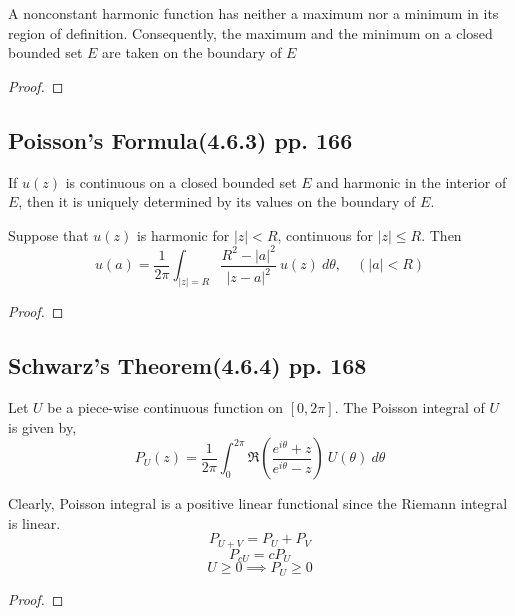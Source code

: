 \begin{theorem}
	A nonconstant harmonic function has neither a maximum nor a minimum in its region of definition. Consequently, the maximum and the minimum on a closed bounded set $E$ are taken on the boundary of $E$
\end{theorem}
\begin{proof}
\end{proof}

\subsection{Poisson's Formula(4.6.3) pp. 166}
\begin{remark}
	If $u(z)$ is continuous on a closed bounded set $E$ and harmonic in the interior of $E$, then it is uniquely determined by its values on the boundary of $E$.
\end{remark}
\begin{theorem}
	Suppose that $u(z)$ is harmonic for $|z| < R$, continuous for $|z| \le R$. Then
	\begin{equation}
		u(a) = \frac{1}{2\pi} \int_{|z|=R} \frac{R^2-|a|^2}{|z-a|^2}\ u(z)\ d\theta, \quad (|a| < R)
	\end{equation}
\end{theorem}
\begin{proof}
\end{proof}

\subsection{Schwarz's Theorem(4.6.4) pp. 168}
\begin{definition}
	Let $U$ be a piece-wise continuous function on $[0,2\pi]$.
	The Poisson integral of $U$ is given by,
	\begin{equation}
		P_U(z) = \frac{1}{2\pi} \int_0^{2\pi} \Re\left(\frac{e^{i\theta}+z}{e^{i\theta}-z}\right)\ U(\theta)\ d\theta
	\end{equation}
\end{definition}

\begin{remark} Clearly, Poisson integral is a positive linear functional since the Riemann integral is linear.
	\[ P_{U+V} = P_U + P_V \]
	\[ P_{cU} = cP_U \]
	\[ U \ge 0 \implies P_U \ge 0 \]
\end{remark}
\begin{proof}
\end{proof}

